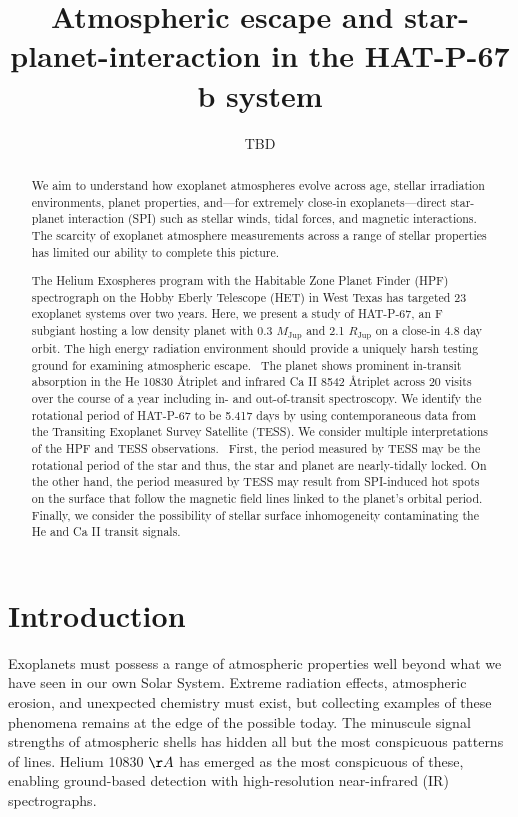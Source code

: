 \documentclass[modern]{aastex631}
\begin{document}

\title{Atmospheric escape and star-planet-interaction in the HAT-P-67 b system}

\author{TBD}


\begin{abstract}
    We aim to understand how exoplanet atmospheres evolve across age, stellar irradiation environments, planet properties, and---for extremely close-in exoplanets---direct star-planet interaction (SPI) such as stellar winds, tidal forces, and magnetic interactions. The scarcity of exoplanet atmosphere measurements across a range of stellar properties has limited our ability to complete this picture.

    The Helium Exospheres program with the Habitable Zone Planet Finder (HPF) spectrograph on the Hobby Eberly Telescope (HET) in West Texas has targeted 23 exoplanet systems over two years. Here, we present a study of HAT-P-67, an F subgiant hosting a low density planet with 0.3 $M_{\mathrm{Jup}}$ and 2.1 $R_{\mathrm{Jup}}$ on a close-in 4.8 day orbit. The high energy radiation environment should provide a uniquely harsh testing ground for examining atmospheric escape.  The planet shows prominent in-transit absorption in the He 10830 \AA triplet and infrared Ca II 8542 \AA triplet across 20 visits over the course of a year including in- and out-of-transit spectroscopy. We identify the rotational period of HAT-P-67 to be 5.417 days by using contemporaneous data from the Transiting Exoplanet Survey Satellite (TESS). We consider multiple interpretations of the HPF and TESS observations.  First, the period measured by TESS may be the rotational period of the star and thus, the star and planet are nearly-tidally locked. On the other hand, the period measured by TESS may result from SPI-induced hot spots on the surface that follow the magnetic field lines linked to the planet's orbital period. Finally, we consider the possibility of stellar surface inhomogeneity contaminating the He and Ca II transit signals.
\end{abstract}


\section{Introduction}\label{sec:intro}

Exoplanets must possess a range of atmospheric properties well beyond what we have seen in our own Solar System.  Extreme radiation effects, atmospheric erosion, and unexpected chemistry must exist, but collecting examples of these phenomena remains at the edge of the possible today. The minuscule signal strengths of atmospheric shells has hidden all but the most conspicuous patterns of lines.  Helium 10830 $\AA$ has emerged as the most conspicuous of these, enabling ground-based detection with high-resolution near-infrared (IR) spectrographs.
\end{document}
